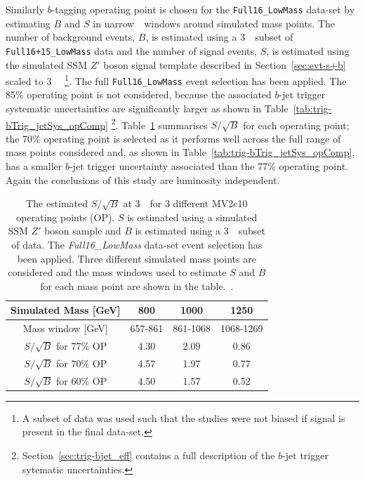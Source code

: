 Similarly $b$-tagging operating point is chosen for the \verb|Full16_LowMass| data-set
by estimating $B$ and $S$ in narrow~\mjj~windows around simulated mass points.
The number of background events, $B$, is estimated  using a
3~\ifb~subset of \verb|Full16+15_LowMass| data and 
the number of signal events, $S$, is estimated using the simulated SSM $Z'$ boson signal template
described in Section~\ref{sec:evt-s+b} scaled to 3~\ifb~
\footnote{A subset of data was used such that the studies were not biased if signal is present in the final data-set.}.
The full \verb|Full16_LowMass| event selection has been applied.
The 85\% operating point is not considered,
because the associated $b$-jet trigger systematic uncertainties
are significantly larger as shown in Table~\ref{tab:trig-bTrig_jetSys_opComp}
\footnote{Section~\ref{sec:trig-bjet_eff} contains a full description of the $b$-jet trigger sytematic uncertainties.}.
Table~\ref{tab:evt-btag_lm} summarises $S/\sqrt{B}$ for each operating point;
the 70\% operating point is selected as it performs well across the full range of mass points considered
and, as shown in Table~\ref{tab:trig-bTrig_jetSys_opComp}, has a smaller $b$-jet trigger uncertainty associated than the 77\% operating point.
Again the conclusions of this study are luminosity independent.

\vspace{-0.4em}
\begin{table}[ht]
\begin{center}
\begin{tabular}{|c||c|c|c|}
  \hline
  Simulated Mass [GeV]            &   800       &  1000       & 1250\\
  \hline
  Mass window [GeV]               &  657-861    &  861-1068   & 1068-1269 \\
  \hline
  $S/\sqrt{B}$ for 77\% OP        &  4.30       &  2.09       & 0.86     \\
  $S/\sqrt{B}$ for 70\% OP        &  4.57       &  1.97       & 0.77     \\
  $S/\sqrt{B}$ for 60\% OP        &  4.50       &  1.57       & 0.52     \\
  \hline
\end{tabular}
\caption[The estimated $S/\sqrt{B}$ at 3~\ifb~for 3 different MV2c10 operating points (OP).
  $S$ is estimated using a simulated SSM $Z'$ boson sample and $B$ is estimated using a 3~\ifb~subset of data.
  The \textit{Full16\_LowMass} data-set event selection has been applied.
  Three different simulated mass points are considered and the mass windows used
  to estimate $S$ and $B$ for each mass point are shown in the table.]
        {The estimated $S/\sqrt{B}$ at 3~\ifb~for 3 different MV2c10 operating points (OP).
          $S$ is estimated using a simulated SSM $Z'$ boson sample and $B$ is estimated using a 3~\ifb~subset of data.
          The \textit{Full16\_LowMass} data-set event selection has been applied.
          Three different simulated mass points are considered and the mass windows used
          to estimate $S$ and $B$ for each mass point are shown in the table.~\cite{dibjet-full_int}.}
\vspace{-2em}
\label{tab:evt-btag_lm}
\end{center}
\end{table}

